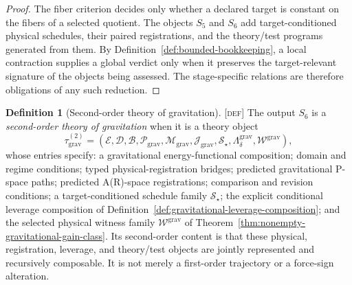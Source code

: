 \documentclass[11pt]{article}
\newcommand{\Defn}{\textsc{[def]}}
\theoremstyle{definition}
\newtheorem{sdefinition}{Definition}
\begin{document}
\begin{proof}
The fiber criterion decides only whether a declared target is constant on the fibers
of a selected quotient. The objects $S_5$ and $S_6$ add target-conditioned physical
schedules, their paired registrations, and the theory/test programs generated from
them. By Definition~\ref{def:bounded-bookkeeping}, a local contraction supplies a
global verdict only when it preserves the target-relevant signature of the objects
being assessed. The stage-specific relations are therefore obligations of any such
reduction.
\end{proof}

\begin{sdefinition}[Second-order theory of gravitation]
\label{def:second-order-gravitation-theory}
\Defn{} The output $S_6$ is a \emph{second-order theory of gravitation} when it is
a theory object
\begin{equation}
\tau_{\mathrm{grav}}^{(2)}=
\left(
\mathcal E,\mathcal D,\mathcal B,
\mathcal P_{\mathrm{grav}},\mathcal M_{\mathrm{grav}},
\mathcal J_{\mathrm{grav}},\mathcal S_{\star},
\Lambda^{\mathrm{grav}}_\delta,\mathcal W^{\mathrm{grav}}
\right),
\label{eq:second-order-gravitation-theory}
\end{equation}
whose entries specify: a gravitational energy-functional composition; domain and
regime conditions; typed physical-registration bridges; predicted gravitational
P-space paths; predicted A(R)-space registrations; comparison and revision
conditions; a target-conditioned schedule family $\mathcal S_{\star}$; the explicit
conditional leverage composition of
Definition~\ref{def:gravitational-leverage-composition}; and the selected physical
witness family $\mathcal W^{\mathrm{grav}}$ of
Theorem~\ref{thm:nonempty-gravitational-gain-class}. Its second-order content
is that these physical, registration, leverage, and theory/test objects are jointly
represented and recursively composable. It is not merely a first-order trajectory or
a force-sign alteration.
\end{sdefinition}
\end{document}
